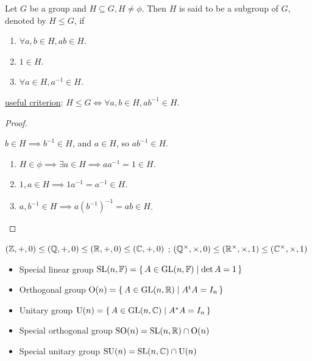 \begin{definition}
  Let $G$ be a group and $H \subseteq G, H \ne \phi$.
  Then $H$ is said to be a subgroup of $G$, denoted by $H \le G$, if
  \begin{enumerate}
    \item $\forall a, b \in H, ab \in H$.
    \item $1 \in H$.
    \item $\forall a \in H, a^{-1} \in H$.
  \end{enumerate}
  \underline{useful criterion}:
  $H \le G \iff \forall a, b \in H, ab^{-1} \in H$.
  \begin{proof} \mbox{}
    \begin{description}[style=nextline]
      \item[$\Rightarrow$] $b \in H \implies b^{-1} \in H$, and $a \in H$, so
        $a b^{-1} \in H$.
      \item[$\Leftarrow$]
        \begin{enumerate}
          \item $H \in \phi \implies \exists a \in H \implies
            aa^{-1} = 1 \in H$.
          \item $1, a \in H \implies 1 a^{-1} = a^{-1} \in H$.
          \item $a, b^{-1} \in H \implies a (b^{-1})^{-1} = ab \in H$.
            \qedhere
        \end{enumerate}
    \end{description}
  \end{proof}
\end{definition}

\begin{example}
  $(\mathbb{Z}, +, 0) \le (\mathbb{Q}, +, 0) \le (\mathbb{R}, +, 0) \le (\mathbb{C}, +, 0)$ ;
  $(\mathbb{Q}^\times, \times, 0) \le (\mathbb{R}^\times, \times, 1) \le (\mathbb{C}^\times, \times, 1)$
\end{example}

\begin{example} \mbox{}
  \begin{itemize}
    \item Special linear group $\text{SL}(n, \mathbb{F}) = \{\, A \in
      \text{GL}(n, \mathbb{F}) \mid \det A = 1 \,\}$
    \item Orthogonal group $\text{O}(n) = \{\, A \in \text{GL}(n, \mathbb{R})
      \mid {A}^\mathrm{t} A = I_n \,\}$
    \item Unitary group $\text{U}(n) = \{\, A \in \text{GL}(n, \mathbb{C}) \mid
      A^* A = I_n \,\}$
    \item Special orthogonal group $\text{SO}(n) = \text{SL}(n, \mathbb{R}) \cap
      \text{O}(n)$
    \item Special unitary group $\text{SU}(n) = \text{SL}(n, \mathbb{C}) \cap
      \text{U}(n)$
  \end{itemize}
\end{example}

